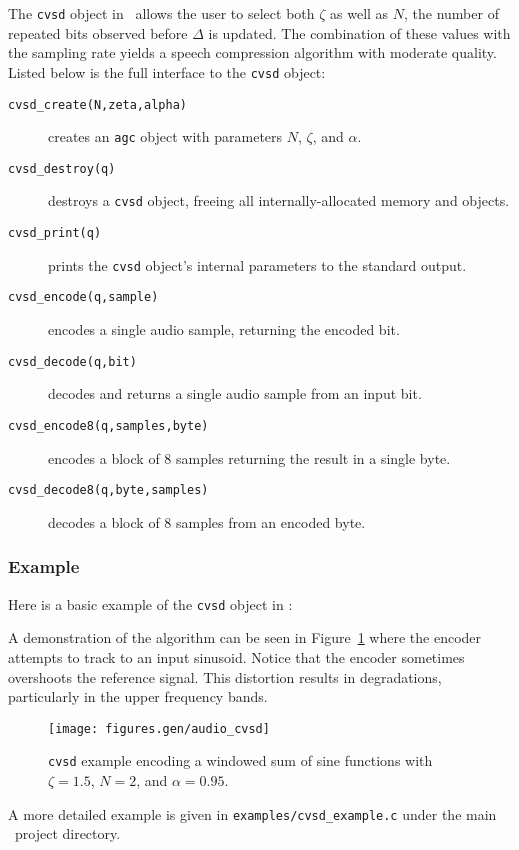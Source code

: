 The {\tt cvsd} object in \liquid\ allows the user to select both $\zeta$
as well as $N$, the number of repeated bits observed before $\Delta$ is
updated.
The combination of these values with the sampling rate yields a speech
compression algorithm with moderate quality.
Listed below is the full interface to the {\tt cvsd} object:
%
\begin{description}
\item[{\tt cvsd\_create(N,zeta,alpha)}]
    creates an {\tt agc} object with parameters $N$, $\zeta$, and
    $\alpha$.
\item[{\tt cvsd\_destroy(q)}]
    destroys a {\tt cvsd} object, freeing all internally-allocated
    memory and objects.
\item[{\tt cvsd\_print(q)}]
    prints the {\tt cvsd} object's internal parameters to the standard
    output.
\item[{\tt cvsd\_encode(q,sample)}]
    encodes a single audio sample, returning the encoded bit.
\item[{\tt cvsd\_decode(q,bit)}]
    decodes and returns a single audio sample from an input bit.
\item[{\tt cvsd\_encode8(q,samples,byte)}]
    encodes a block of 8 samples returning the result in a single byte.
\item[{\tt cvsd\_decode8(q,byte,samples)}]
    decodes a block of 8 samples from an encoded byte.
\end{description}

\subsubsection{Example}
\label{module:audio:cvsd:example}

Here is a basic example of the {\tt cvsd} object in \liquid:
%

%
A demonstration of the algorithm can be seen in
Figure~\ref{fig:module:audio:cvsd} where the encoder attempts to track to an
input sinusoid.
Notice that the encoder sometimes overshoots the reference signal.
This distortion results in degradations, particularly in the upper frequency
bands.
%
\begin{figure}
\centering
  \texttt{[image: figures.gen/audio\_cvsd]}
\caption{
    {\tt cvsd} example encoding a windowed sum of sine functions
    with $\zeta=1.5$, $N=2$, and $\alpha=0.95$.}
\label{fig:module:audio:cvsd}
\end{figure}
%
A more detailed example is given in
{\tt examples/cvsd\_example.c}
under the main \liquid\ project directory.
